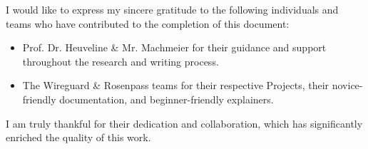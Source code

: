 \documentclass[sigconf]{acmart}
\begin{document}
\begin{acks}
I would like to express my sincere gratitude to the following individuals and teams who have contributed to the completion of this document:

\begin{itemize}
  \item Prof. Dr. Heuveline \& Mr. Machmeier for their guidance and support throughout the research and writing process.
  \item The Wireguard \& Rosenpass teams for their respective Projects, their novice-friendly documentation, and beginner-friendly explainers.
\end{itemize}

I am truly thankful for their dedication and collaboration, which has significantly enriched the quality of this work.
\end{acks}




\appendix

\end{document}
